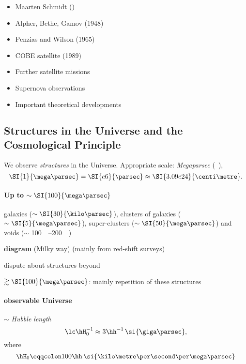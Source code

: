 \begin{itemize}
\item Maarten Schmidt () \cite{SCHMIDT1963}
\item Alpher, Bethe, Gamov (1948)
\item Penzias and Wilson (1965) 
\cite{Dicke1965,Penzias1965,Penzias1965a}
\item COBE satellite (1989)
\item Further satellite missions
\item Supernova observations
\item Important theoretical developments
\end{itemize}


\subsection{Structures in the Universe and the Cosmological Principle}
We observe \emph{structures} in the Universe. Appropriate scale: 
\emph{Megaparsec} (\si{\mega\parsec}),
\begin{equation}
\SI{1}{\mega\parsec} = \SI{e6}{\parsec} \approx \SI{3.09e24}{\centi\metre}.
\end{equation}

\paragraph{Up to $\sim\SI{100}{\mega\parsec}$} galaxies 
($\sim\SI{30}{\kilo\parsec}$), clusters of galaxies 
($\sim\SI{5}{\mega\parsec}$), super-clusters ($\sim\SI{50}{\mega\parsec}$) and 
voids ($\sim$ \SIrange{100}{200}{\mega\parsec})

\textbf{diagram} (Milky way) (mainly from red-shift surveys)

dispute about structures beyond

$\gtrsim\SI{100}{\mega\parsec}$: mainly repetition of these structures

\paragraph{observable Universe} $\sim$ \emph{Hubble length}
\begin{equation}
\lc \hH_0^{-1} \approx 3\hh^{-1}\,\si{\giga\parsec},
\end{equation}
where
\begin{equation}
\hH_0 \eqqcolon 100\hh\,\si{\kilo\metre\per\second\per\mega\parsec}
\end{equation}

